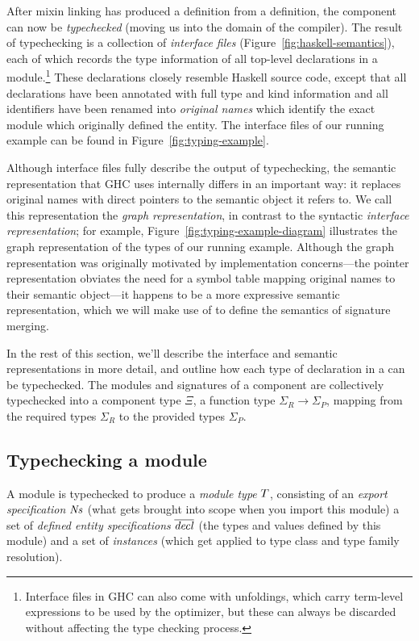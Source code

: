 After mixin linking has produced a \unit{} definition from a \ccomp{}
definition, the component can now be \emph{typechecked} (moving us into
the domain of the compiler).  The result of
typechecking is a collection of \emph{interface files}
(Figure~\ref{fig:haskell-semantics}), each of which records the type
information of all top-level declarations in a
module.\footnote{Interface files in GHC can also come with unfoldings,
which carry term-level expressions to be used by the optimizer, but
these can always be discarded without affecting the type checking
process.}  These declarations closely resemble Haskell source code,
except that all declarations have been annotated with full type and kind
information and all identifiers have been renamed into \emph{original
names} which identify the exact module which originally defined the
entity.  The interface files of our running example can be found
in Figure~\ref{fig:typing-example}.

Although interface files fully describe the output of typechecking, the
semantic representation that GHC uses internally differs in an important
way: it replaces original names with direct pointers to the semantic
object it refers to. We call this representation the \emph{graph
representation}, in contrast to the syntactic \emph{interface
representation}; for example, Figure~\ref{fig:typing-example-diagram}
illustrates the graph representation of the types of our running
example.  Although the graph representation was originally motivated by
implementation concerns---the pointer representation obviates the need
for a symbol table mapping original names to their semantic object---it
happens to be a more expressive semantic representation, which we will
make use of to define the semantics of signature merging.

In the rest of this section, we'll describe the interface and semantic
representations in more detail, and outline how each type of declaration
in a \unit{} can be typechecked.  The modules and signatures of a
component are collectively typechecked into a component type
$\Xi$, a function type $\Sigma_R \rightarrow \Sigma_P$,
mapping from the required types $\Sigma_R$ to the provided types
$\Sigma_P$.

\subsection{Typechecking a module}

A module is typechecked to produce a \emph{module
type} $T$, consisting of an \emph{export
specification} $\mathit{Ns}$ (what gets brought into scope when
you import this module) a set of \emph{defined entity specifications}
$\overline{\mathit{decl}}$ (the types and values defined by
this module) and a set of \emph{instances} (which get
applied to type class and type family resolution).

